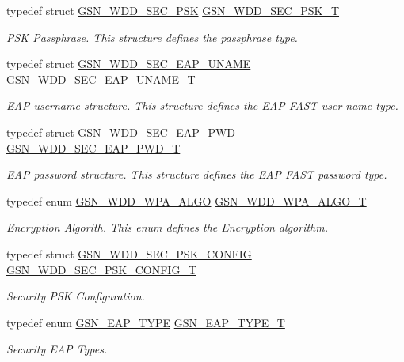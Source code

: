 \begin{DoxyCompactItemize}
typedef struct \hyperlink{a00293}{GSN\_\-WDD\_\-SEC\_\-PSK} \hyperlink{a00604_aa76fb465fe2fea1c3dbb630fefe969b8}{GSN\_\-WDD\_\-SEC\_\-PSK\_\-T}
\begin{DoxyCompactList}\small\item\em PSK Passphrase. This structure defines the passphrase type. \end{DoxyCompactList}\item 
typedef struct \hyperlink{a00290}{GSN\_\-WDD\_\-SEC\_\-EAP\_\-UNAME} \hyperlink{a00604_ae39e817c2244f895c6f66f5154508933}{GSN\_\-WDD\_\-SEC\_\-EAP\_\-UNAME\_\-T}
\begin{DoxyCompactList}\small\item\em EAP username structure. This structure defines the EAP FAST user name type. \end{DoxyCompactList}\item 
typedef struct \hyperlink{a00289}{GSN\_\-WDD\_\-SEC\_\-EAP\_\-PWD} \hyperlink{a00604_a24b6b0a6365311f34b8e8af6acf64711}{GSN\_\-WDD\_\-SEC\_\-EAP\_\-PWD\_\-T}
\begin{DoxyCompactList}\small\item\em EAP password structure. This structure defines the EAP FAST password type. \end{DoxyCompactList}\item 
typedef enum \hyperlink{a00604_aecc980a483691db1cb8b70fed3fdb438}{GSN\_\-WDD\_\-WPA\_\-ALGO} \hyperlink{a00604_ae6d4a101986255ba5cb98e42ff3fb2ef}{GSN\_\-WDD\_\-WPA\_\-ALGO\_\-T}
\begin{DoxyCompactList}\small\item\em Encryption Algorith. This enum defines the Encryption algorithm. \end{DoxyCompactList}\item 
typedef struct \hyperlink{a00294}{GSN\_\-WDD\_\-SEC\_\-PSK\_\-CONFIG} \hyperlink{a00677_ga08bfb38518da7f8041c06cb1a661f471}{GSN\_\-WDD\_\-SEC\_\-PSK\_\-CONFIG\_\-T}
\begin{DoxyCompactList}\small\item\em Security PSK Configuration. \end{DoxyCompactList}\item 
typedef enum \hyperlink{a00677_ga95dd88b436cd52a999dda3865de87fe3}{GSN\_\-EAP\_\-TYPE} \hyperlink{a00677_ga89d1dbb13f1366a19aef9782b2190e36}{GSN\_\-EAP\_\-TYPE\_\-T}
\begin{DoxyCompactList}\small\item\em Security EAP Types. \end{DoxyCompactList}\item 

\end{DoxyCompactItemize}

